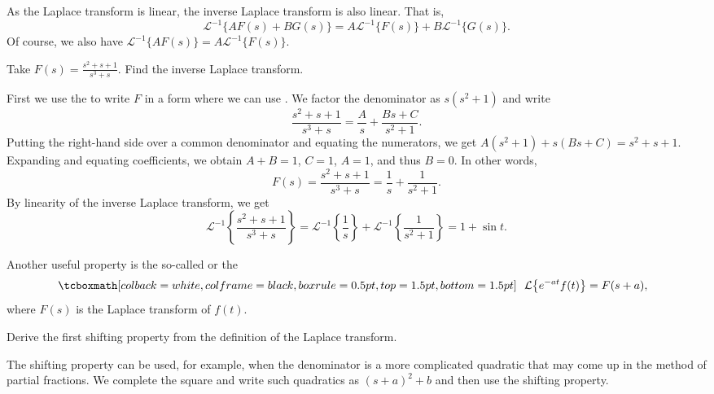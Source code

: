 As the Laplace transform is linear, the inverse Laplace
transform is also linear.  That is,
\begin{equation*}
{\mathcal{L}}^{-1} \bigl\{ A F(s) + B G(s) \bigr\} =
A {\mathcal{L}}^{-1} \bigl\{ F(s) \bigr\} +
B {\mathcal{L}}^{-1} \bigl\{ G(s) \bigr\} .
\end{equation*}
Of course, we also have
${\mathcal{L}}^{-1} \bigl\{ A F(s) \bigr\} =
A {\mathcal{L}}^{-1} \bigl\{ F(s) \bigr\}$.

\begin{example}
Take
$F(s) = \frac{s^2+s+1}{s^3+s}$.  Find the inverse Laplace transform.

First we use the \emph{} to write $F$ in a form where
we can use .  We factor the denominator as
$s(s^2+1)$ and write
\begin{equation*}
\frac{s^2+s+1}{s^3+s}
=
\frac{A}{s} + 
\frac{Bs+C}{s^2+1} .
\end{equation*}
Putting the right-hand side over a common
denominator and equating the numerators, we get
$A(s^2+1) + s(Bs+C) = s^2+s+1$.  Expanding and equating coefficients,
we obtain $A+B = 1$, $C=1$, $A=1$,
and thus $B=0$.  In
other words,
\begin{equation*}
F(s) =
\frac{s^2+s+1}{s^3+s}
=
\frac{1}{s} +
\frac{1}{s^2+1} .
\end{equation*}
By linearity of the inverse Laplace transform, we get 
\begin{equation*}
{\mathcal{L}}^{-1} \left\{ 
\frac{s^2+s+1}{s^3+s} \right\}
=
{\mathcal{L}}^{-1} \left\{ 
\frac{1}{s} \right\} 
+
{\mathcal{L}}^{-1} \left\{ 
\frac{1}{s^2+1} \right\}
=
1 + 
\sin t .
\end{equation*}
\end{example}

Another useful property is the 
so-called \emph{} or
the \emph{}
\begin{equation*}
\mybxbg{~~
\mathcal{L} \bigl\{ e^{-at} f(t) \bigr\} = F(s+a) ,
~~}
\end{equation*}
where $F(s)$ is the Laplace transform of $f(t)$.

\begin{exercise}
Derive the first shifting property
from the definition of the Laplace transform.
\end{exercise}

The shifting property can be used, for example, when the denominator is a
more complicated quadratic that may come up in the method of partial
fractions.  We complete the square and write such quadratics as ${(s+a)}^2+b$
and then use the shifting property.

